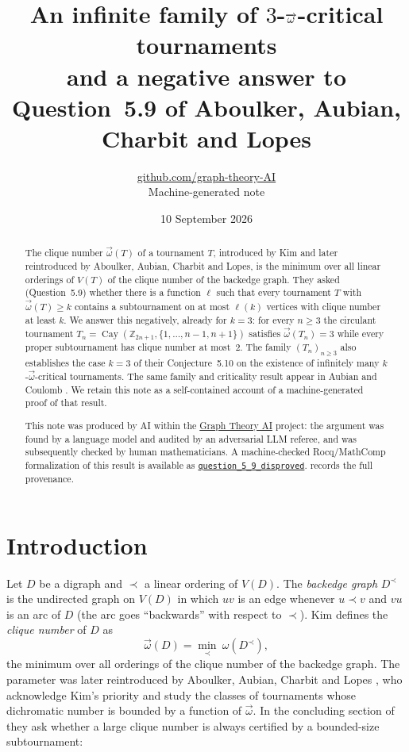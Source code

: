 \documentclass[11pt,a4paper]{article}
\title{An infinite family of $3$-$\cl$-critical tournaments\\ and a negative answer to Question~5.9 of Aboulker, Aubian, Charbit and Lopes}
\author{\href{https://github.com/graph-theory-AI}{github.com/graph-theory-AI}\\[2pt] \normalsize Machine-generated note}
\date{10 September 2026}
\theoremstyle{plain}
\theoremstyle{definition}
\theoremstyle{remark}
\newcommand{\cl}{\overrightarrow{\omega}}
\newcommand{\Z}{\mathbb Z}
\newcommand{\Cay}{\operatorname{Cay}}
\begin{document}
\maketitle


\begin{abstract}
The clique number $\cl(T)$ of a tournament $T$, introduced by Kim and later reintroduced by Aboulker, Aubian, Charbit and Lopes, is the minimum over all linear orderings of $V(T)$ of the clique number of the backedge graph. They asked (Question~5.9) whether there is a function $\ell$ such that every tournament $T$ with $\cl(T)\ge k$ contains a subtournament on at most $\ell(k)$ vertices with clique number at least $k$. We answer this negatively, already for $k=3$: for every $n\ge3$ the circulant tournament $T_n=\Cay(\Z_{2n+1},\{1,\dots,n-1,n+1\})$ satisfies $\cl(T_n)=3$ while every proper subtournament has clique number at most~$2$. The family $(T_n)_{n\ge3}$ also establishes the case $k=3$ of their Conjecture~5.10 on the existence of infinitely many $k$-$\cl$-critical tournaments.
The same family and criticality result appear in Aubian and Coulomb \cite[6.1]{AC26}. We retain this note as a self-contained account of a machine-generated proof of that result.

\medskip\noindent\small
This note was produced by AI within the \href{https://github.com/graph-theory-AI/Graph-Theory-LLM-Proofs}{Graph Theory AI} project:
the argument was found by a language model and audited by an adversarial LLM
referee, and was subsequently checked by human mathematicians.
A machine-checked Rocq/MathComp formalization of this result is available as
\href{https://github.com/LLM4Rocq/graph-theory-rocq/blob/main/digraph-theory/theories/applications/question_5_9_resolution.v}{\texttt{question\_5\_9\_disproved}}.
 records the full provenance.

\end{abstract}

\section{Introduction}

Let $D$ be a digraph and $\prec$ a linear ordering of $V(D)$. The \emph{backedge graph} $D^\prec$ is the undirected graph on $V(D)$ in which $uv$ is an edge whenever $u\prec v$ and $vu$ is an arc of $D$ (the arc goes ``backwards'' with respect to $\prec$). Kim \cite[p.~71]{Kim13} defines the \emph{clique number} of $D$ as
\[
 \cl(D)=\min_{\prec}\ \omega(D^\prec),
\]
the minimum over all orderings of the clique number of the backedge graph. The parameter was later reintroduced by Aboulker, Aubian, Charbit and Lopes \cite{AACL23}, who acknowledge Kim's priority and study the classes of tournaments whose dichromatic number is bounded by a function of $\cl$. In the concluding section of \cite{AACL23} they ask whether a large clique number is always certified by a bounded-size subtournament:
\end{document}
